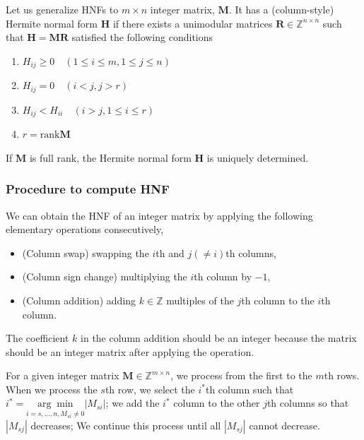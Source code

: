 Let us generalize HNFs to $m \times n$ integer matrix, $\bm{M}$.
It has a (column-style) Hermite normal form $\bm{H}$ if there exists a unimodular matrices $\bm{R} \in \mathbb{Z}^{n \times n}$ such that $\bm{H}=\bm{MR}$ satisfied the following conditions
\begin{enumerate}
    \item $H_{ij} \geq 0 \quad (1 \leq i \leq m, 1 \leq j \leq n)$
    \item $H_{ij} = 0 \quad (i < j , j > r)$
    \item $H_{ij} < H_{ii} \quad (i > j, 1 \leq i \leq r)$
    \item $r = \mathrm{rank} \bm{M}$
\end{enumerate}

If $\mathbf{M}$ is full rank, the Hermite normal form $\bm{H}$ is uniquely determined.

\subsubsection{\label{sec:hnf-computation}Procedure to compute HNF}

We can obtain the HNF of an integer matrix by applying the following elementary operations consecutively,
\begin{itemize}
  \item (Column swap) swapping the $i$th and $j (\neq i)$th columns,
  \item (Column sign change) multiplying the $i$th column by $-1$,
  \item (Column addition) adding $k \in \mathbb{Z}$ multiples of the $j$th column to the $i$th column.
\end{itemize}
The coefficient $k$ in the column addition should be an integer because the matrix should be an integer matrix after applying the operation.

For a given integer matrix $\bm{M} \in \mathbb{Z}^{m \times n}$, we process from the first to the $m$th rows.
When we process the $s$th row, we select the $i^{\ast}$th column such that $i^{\ast} = \underset{i = s, \dots, n, M_{si} \neq 0}{\arg\min} |M_{si}|$;
we add the $i^{\ast}$ column to the other $j$th columns so that $|M_{sj}|$ decreases;
We continue this process until all $|M_{sj}|$ cannot decrease.

